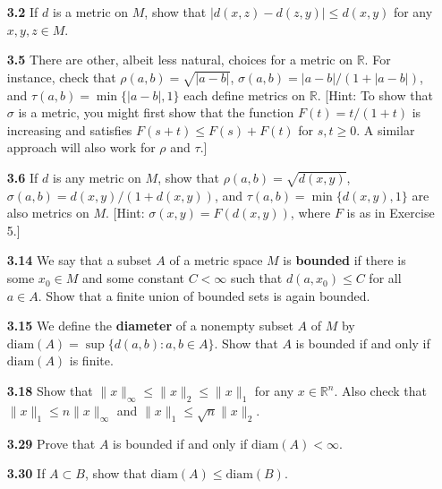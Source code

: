 \documentclass[12pt]{amsart}
\def\diam{\mathrm{diam}}
\def\RR{{\mathbb R}}
\begin{document}
\begin{enumerate}

\item[\bf 3.2] If $d$ is a metric on $M$, show that $|d(x,z)-d(z,y)|\leq d(x,y)$ for any $x,y,z\in M$.

\bigskip

\item[\bf 3.5] There are other, albeit less natural, choices for a metric on $\RR$. For instance, check that $\rho(a, b)=\sqrt{|a-b|}$, $\sigma(a,b)=|a-b|/(1+|a-b|)$, and $\tau(a,b)=\min\{|a-b|,1\}$ each define metrics on $\RR$. [Hint: To show that $\sigma$ is a metric, you might first show that the function $F(t)=t/(1+t)$ is increasing and satisfies $F(s+t)\leq F(s)+F(t)$ for $s,t\geq 0$. A similar approach will also work for $\rho$ and $\tau$.]

\bigskip

\item[\bf 3.6] If $d$ is any metric on $M$, show that $\rho(a, b)=\sqrt{d(x,y)}$, $\sigma(a,b)=d(x,y)/(1+d(x,y))$, and $\tau(a,b)=\min\{d(x,y),1\}$ are also metrics on $M$. [Hint: $\sigma(x,y)=F(d(x,y))$, where $F$ is as in Exercise 5.]

\bigskip

\item[\bf 3.14] We say that a subset $A$ of a metric space $M$ is {\bf bounded} if there is some $x_0\in M$ and some constant $C<\infty$ such that $d(a, x_0)\leq C$ for all $a\in A$. Show that a finite union of bounded sets is again bounded.

\bigskip

\item[\bf 3.15] We define the {\bf diameter} of a nonempty subset $A$ of $M$ by $\diam(A)=\sup\{d(a,b) : a,b\in A\}$. Show that $A$ is bounded if and only if $\diam(A)$ is finite. 

\bigskip

\item[\bf 3.18] Show that $\|x\|_\infty\leq \|x\|_2\leq \|x\|_1$ for any $x\in \RR^n$. Also check that $\|x\|_1\leq n\|x\|_\infty$ and $\|x\|_1 \leq \sqrt n\|x\|_2$.

\bigskip

\item[\bf 3.29] Prove that $A$ is bounded if and only if $\diam(A)<\infty$.

\bigskip

\item[\bf 3.30] If $A\subset B$, show that $\diam(A)\leq \diam(B)$.


\end{enumerate}
\end{document}
